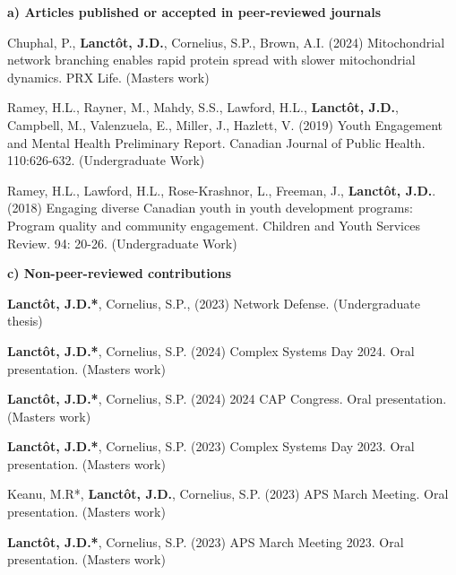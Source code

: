 \begin{contributions}
\vspace{-1.0em}
\textbf{a) Articles published or accepted in peer-reviewed journals}

\vspace{-0.6em}
Chuphal, P., \textbf{Lanct\^{o}t, J.D.}, Cornelius, S.P., Brown, A.I. (2024) Mitochondrial network branching enables rapid protein spread with slower mitochondrial dynamics. PRX Life. (Masters work)

Ramey, H.L., Rayner, M., Mahdy, S.S.,  Lawford, H.L., \textbf{Lanct\^{o}t, J.D.}, Campbell, M., Valenzuela, E., Miller, J., Hazlett, V. (2019) Youth Engagement and Mental Health Preliminary Report. Canadian Journal of Public Health. 110:626-632. (Undergraduate Work)

Ramey, H.L.,  Lawford, H.L., Rose-Krashnor, L., Freeman, J., \textbf{Lanct\^{o}t, J.D.}. (2018) Engaging diverse Canadian youth in youth development programs: Program quality and community engagement. Children and Youth Services Review. 94: 20-26.  (Undergraduate Work)


\textbf{c) Non-peer-reviewed contributions}

\vspace{-0.6em}
\textbf{Lanct\^{o}t, J.D.*}, Cornelius, S.P., (2023) Network Defense. (Undergraduate thesis)

\textbf{Lanct\^{o}t, J.D.*}, Cornelius, S.P. (2024) Complex Systems Day 2024. Oral presentation. (Masters work)

\textbf{Lanct\^{o}t, J.D.*}, Cornelius, S.P. (2024) 2024 CAP Congress. Oral presentation. (Masters work)

\textbf{Lanct\^{o}t, J.D.*}, Cornelius, S.P. (2023) Complex Systems Day 2023. Oral presentation. (Masters work)

Keanu, M.R*, \textbf{Lanct\^{o}t, J.D.}, Cornelius, S.P. (2023) APS March Meeting. Oral presentation. (Masters work)

\textbf{Lanct\^{o}t, J.D.*}, Cornelius, S.P. (2023) APS March Meeting 2023. Oral presentation. (Masters work)


\end{contributions}
